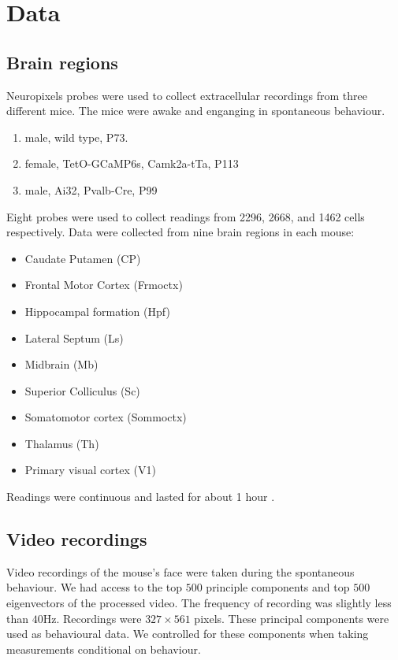 \documentclass[a4paper,12pt]{article}
\theoremstyle{definition}
\begin{document}

\section{Data}
    \subsection{Brain regions}
    Neuropixels probes were used to collect extracellular recordings \cite{jun} from three different mice. The mice were awake and enganging in spontaneous behaviour. 
    \begin{enumerate}
        \item male, wild type, P73. %
        \item female, TetO-GCaMP6s, Camk2a-tTa, P113 %
        \item male, Ai32, Pvalb-Cre, P99 %
    \end{enumerate}
    Eight probes were used to collect readings from 2296, 2668, and 1462 cells respectively. Data were collected from nine brain regions in each mouse:
    \begin{itemize}
        \item Caudate Putamen (CP)
        \item Frontal Motor Cortex (Frmoctx)
        \item Hippocampal formation (Hpf)
        \item Lateral Septum (Ls)
        \item Midbrain (Mb)
        \item Superior Colliculus (Sc)
        \item Somatomotor cortex (Sommoctx)
        \item Thalamus (Th)
        \item Primary visual cortex (V1)
    \end{itemize}
    Readings were continuous and lasted for about 1 hour \cite{stringer}.

    \subsection{Video recordings}\label{sec:video_recordings}
    Video recordings of the mouse's face were taken during the spontaneous behaviour. We had access to the top $500$ principle components and top $500$ eigenvectors of the processed video. The frequency of recording was slightly less than $40$Hz. Recordings were $327 \times 561$ pixels. These principal components were used as behavioural data. We controlled for these components when taking measurements conditional on behaviour. 
\end{document}
